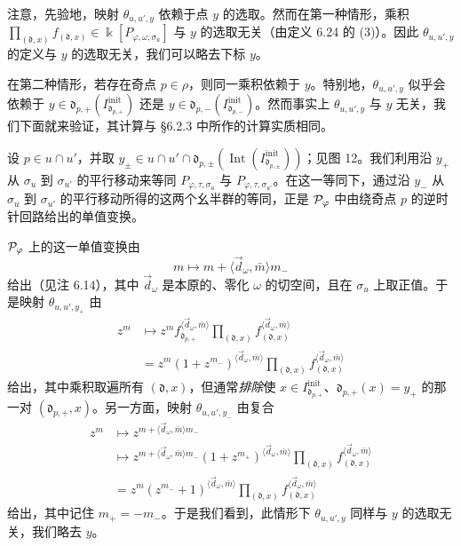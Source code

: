 注意，先验地，映射 $\theta_{u,u',y}$ 依赖于点 $y$ 的选取。然而在第一种情形，乘积 $\prod_{(\mathfrak d,x)}f_{(\mathfrak d,x)}\in\Bbbk[P_{\varphi,\omega,\sigma_u}]$ 与 $y$ 的选取无关（由定义 6.24 的 (3)）。因此 $\theta_{u,u',y}$ 的定义与 $y$ 的选取无关，我们可以略去下标 $y$。

在第二种情形，若存在奇点 $p\in\rho$，则同一乘积依赖于 $y$。特别地，$\theta_{u,u',y}$ 似乎会依赖于 $y\in\mathfrak d_{p,+}(I^{\mathrm{init}}_{\mathfrak d_{p,+}})$ 还是 $y\in\mathfrak d_{p,-}(I^{\mathrm{init}}_{\mathfrak d_{p,-}})$。然而事实上 $\theta_{u,u',y}$ 与 $y$ 无关，我们下面就来验证，其计算与 §6.2.3 中所作的计算实质相同。

设 $p\in u\cap u'$，并取 $y_\pm\in u\cap u'\cap\mathfrak d_{p,\pm}(\operatorname{Int}(I^{\mathrm{init}}_{\mathfrak d_{p,\pm}}))$；见图 12。我们利用沿 $y_+$ 从 $\sigma_u$ 到 $\sigma_{u'}$ 的平行移动来等同 $P_{\varphi,\tau,\sigma_u}$ 与 $P_{\varphi,\tau,\sigma_{u'}}$。在这一等同下，通过沿 $y_-$ 从 $\sigma_u$ 到 $\sigma_{u'}$ 的平行移动所得的这两个幺半群的等同，正是 $\mathcal{P}_\varphi$ 中由绕奇点 $p$ 的逆时针回路给出的单值变换。


$\mathcal{P}_\varphi$ 上的这一单值变换由
\[
  m\mapsto m+\langle \vec d_\omega,\bar m\rangle m_-
\]
给出（见注 6.14），其中 $\vec d_\omega$ 是本原的、零化 $\omega$ 的切空间，且在 $\sigma_u$ 上取正值。于是映射 $\theta_{u,u',y_+}$ 由
\[
  \begin{aligned}
    z^m&\mapsto z^mf_{\mathfrak d_{p,+}}^{\langle \vec d_\omega,\bar m\rangle}
    \prod_{(\mathfrak d,x)}f_{(\mathfrak d,x)}^{\langle \vec d_\omega,\bar m\rangle}\\
    &=z^m(1+z^{m_-})^{\langle \vec d_\omega,\bar m\rangle}
    \prod_{(\mathfrak d,x)}f_{(\mathfrak d,x)}^{\langle \vec d_\omega,\bar m\rangle}
  \end{aligned}
\]
给出，其中乘积取遍所有 $(\mathfrak d,x)$，但通常\emph{排除}使 $x\in I^{\mathrm{init}}_{\mathfrak d_{p,+}}$、$\mathfrak d_{p,+}(x)=y_+$ 的那一对 $(\mathfrak d_{p,+},x)$。另一方面，映射 $\theta_{u,u',y_-}$ 由复合
\[
  \begin{aligned}
    z^m&\mapsto z^{m+\langle \vec d_\omega,\bar m\rangle m_-}\\
    &\mapsto z^{m+\langle \vec d_\omega,\bar m\rangle m_-}(1+z^{m_+})^{\langle \vec d_\omega,\bar m\rangle}
    \prod_{(\mathfrak d,x)}f_{(\mathfrak d,x)}^{\langle \vec d_\omega,\bar m\rangle}\\
    &=z^m(z^{m_-}+1)^{\langle \vec d_\omega,\bar m\rangle}
    \prod_{(\mathfrak d,x)}f_{(\mathfrak d,x)}^{\langle \vec d_\omega,\bar m\rangle}
  \end{aligned}
\]
给出，其中记住 $m_+=-m_-$。于是我们看到，此情形下 $\theta_{u,u',y}$ 同样与 $y$ 的选取无关，我们略去 $y$。


